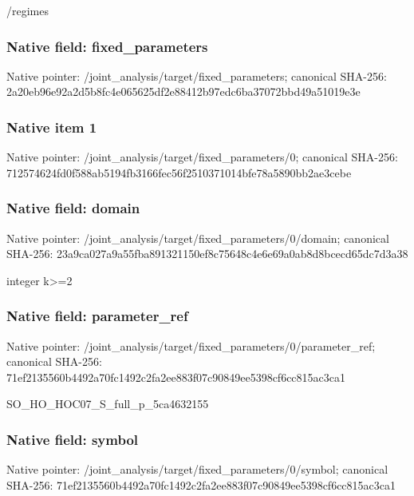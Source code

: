 \documentclass[10pt,a4paper]{article}
\begin{document}
\begingroup\raggedright\sloppy /\allowbreak{}regimes\par\endgroup

\subsubsection{Native field: fixed\_\allowbreak{}parameters}
Native pointer: /joint\_\allowbreak{}analysis/target/fixed\_\allowbreak{}parameters; canonical SHA-256: 2a20eb96e92a2d5b8fc4e065625df2e88412b97edc6ba37072bbd49a51019e3e

\subsubsection{Native item 1}
Native pointer: /joint\_\allowbreak{}analysis/target/fixed\_\allowbreak{}parameters/0; canonical SHA-256: 712574624fd0f588ab5194fb3166fec56f2510371014bfe78a5890bb2ae3cebe

\subsubsection{Native field: domain}
Native pointer: /joint\_\allowbreak{}analysis/target/fixed\_\allowbreak{}parameters/0/domain; canonical SHA-256: 23a9ca027a9a55fba891321150ef8c75648c4e6e69a0ab8d8bcecd65dc7d3a38

\begingroup\raggedright\sloppy integer k>=\allowbreak{}2\par\endgroup

\subsubsection{Native field: parameter\_\allowbreak{}ref}
Native pointer: /joint\_\allowbreak{}analysis/target/fixed\_\allowbreak{}parameters/0/parameter\_\allowbreak{}ref; canonical SHA-256: 71ef2135560b4492a70fc1492c2fa2ee883f07c90849ee5398cf6cc815ac3ca1

\begingroup\raggedright\sloppy SO\_\allowbreak{}HO\_\allowbreak{}HOC07\_\allowbreak{}S\_\allowbreak{}full\_\allowbreak{}p\_\allowbreak{}5ca4632155\par\endgroup

\subsubsection{Native field: symbol}
Native pointer: /joint\_\allowbreak{}analysis/target/fixed\_\allowbreak{}parameters/0/symbol; canonical SHA-256: 71ef2135560b4492a70fc1492c2fa2ee883f07c90849ee5398cf6cc815ac3ca1
\end{document}
